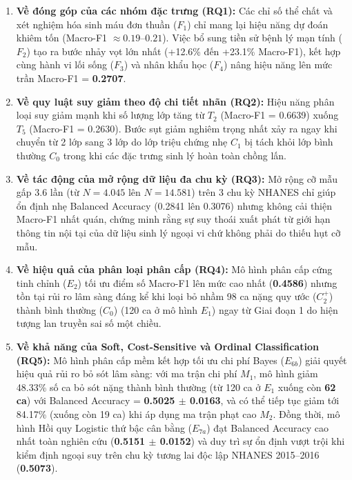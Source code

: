 \begin{enumerate}
    \item \textbf{Về đóng góp của các nhóm đặc trưng (RQ1):} Các chỉ số thể chất và xét nghiệm hóa sinh máu đơn thuần ($F_1$) chỉ mang lại hiệu năng dự đoán khiêm tốn (Macro-F1 $\approx 0.19$--$0.21$). Việc bổ sung tiền sử bệnh lý mạn tính ($F_2$) tạo ra bước nhảy vọt lớn nhất (+12.6\% đến +23.1\% Macro-F1), kết hợp cùng hành vi lối sống ($F_3$) và nhân khẩu học ($F_4$) nâng hiệu năng lên mức trần Macro-F1 = \textbf{0.2707}.
    \item \textbf{Về quy luật suy giảm theo độ chi tiết nhãn (RQ2):} Hiệu năng phân loại suy giảm mạnh khi số lượng lớp tăng từ $T_2$ (Macro-F1 = 0.6639) xuống $T_5$ (Macro-F1 = 0.2630). Bước sụt giảm nghiêm trọng nhất xảy ra ngay khi chuyển từ 2 lớp sang 3 lớp do lớp triệu chứng nhẹ $C_1$ bị tách khỏi lớp bình thường $C_0$ trong khi các đặc trưng sinh lý hoàn toàn chồng lấn.
    \item \textbf{Về tác động của mở rộng dữ liệu đa chu kỳ (RQ3):} Mở rộng cỡ mẫu gấp 3.6 lần (từ $N = 4.045$ lên $N = 14.581$) trên 3 chu kỳ NHANES chỉ giúp ổn định nhẹ Balanced Accuracy (0.2841 lên 0.3076) nhưng không cải thiện Macro-F1 nhất quán, chứng minh rằng sự suy thoái xuất phát từ giới hạn thông tin nội tại của dữ liệu sinh lý ngoại vi chứ không phải do thiếu hụt cỡ mẫu.
    \item \textbf{Về hiệu quả của phân loại phân cấp (RQ4):} Mô hình phân cấp cứng tinh chỉnh ($E_2$) tối ưu điểm số Macro-F1 lên mức cao nhất (\textbf{0.4586}) nhưng tồn tại rủi ro lâm sàng đáng kể khi loại bỏ nhầm 98 ca nặng quy ước ($C_2^+$) thành bình thường ($C_0$) (120 ca ở mô hình $E_1$) ngay từ Giai đoạn 1 do hiện tượng lan truyền sai số một chiều.
    \item \textbf{Về khả năng của Soft, Cost-Sensitive và Ordinal Classification (RQ5):} Mô hình phân cấp mềm kết hợp tối ưu chi phí Bayes ($E_{6b}$) giải quyết hiệu quả rủi ro bỏ sót lâm sàng: với ma trận chi phí $M_1$, mô hình giảm 48.33\% số ca bỏ sót nặng thành bình thường (từ 120 ca ở $E_1$ xuống còn \textbf{62 ca}) với Balanced Accuracy = \textbf{0.5025 $\pm$ 0.0163}, và có thể tiếp tục giảm tới 84.17\% (xuống còn 19 ca) khi áp dụng ma trận phạt cao $M_2$. Đồng thời, mô hình Hồi quy Logistic thứ bậc cân bằng ($E_{7a}$) đạt Balanced Accuracy cao nhất toàn nghiên cứu (\textbf{0.5151 $\pm$ 0.0152}) và duy trì sự ổn định vượt trội khi kiểm định ngoại suy trên chu kỳ tương lai độc lập NHANES 2015--2016 (\textbf{0.5073}).
\end{enumerate}

